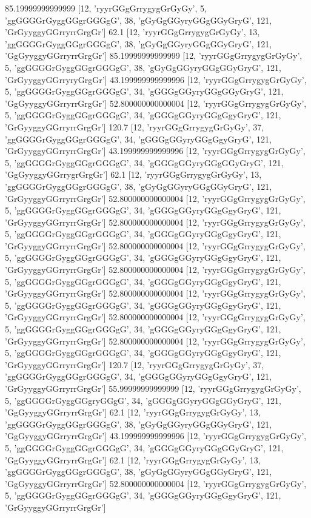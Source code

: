 85.19999999999999 [12, 'ryyrGGgGrrygygGrGyGy', 5, 'ggGGGGrGyggGGgrGGGgG', 38, 'gGyGgGGyryGGgGGyGryG', 121, 'GrGyyggyGGrryrrGrgGr']
62.1 [12, 'ryyrGGgGrrygygGrGyGy', 13, 'ggGGGGrGyggGGgrGGGgG', 38, 'gGyGgGGyryGGgGGyGryG', 121, 'GgGyyggyGGrryrrGrgGr']
85.19999999999999 [12, 'ryyrGGgGrrygygGrGyGy', 5, 'ggGGGGrGyggGGgrGGGgG', 38, 'gGyGgGGyryGGgGGyGryG', 121, 'GrGyyggyGGrryryGrgGr']
43.199999999999996 [12, 'ryyrGGgGrrygygGrGyGy', 5, 'ggGGGGrGyggGGgrGGGgG', 34, 'gGGGgGGyryGGgGGyGryG', 121, 'GgGyyggyGGrryrrGrgGr']
52.800000000000004 [12, 'ryyrGGgGrrygygGrGyGy', 5, 'ggGGGGrGyggGGgrGGGgG', 34, 'gGGGgGGyryGGgGgyGryG', 121, 'GrGyyggyGGrryrrGrgGr']
120.7 [12, 'ryyrGGgGrrygygGrGyGy', 37, 'ggGGGGrGyggGGgrGGGgG', 34, 'gGGGgGGyryGGgGgyGryG', 121, 'GrGyyggyGGrryrrGrgGr']
43.199999999999996 [12, 'ryyrGGgGrrygygGrGyGy', 5, 'ggGGGGrGyggGGgrGGGgG', 34, 'gGGGgGGyryGGgGGyGryG', 121, 'GgGyyggyGGrrygrGrgGr']
62.1 [12, 'ryyrGGgGrrygygGrGyGy', 13, 'ggGGGGrGyggGGgrGGGgG', 38, 'gGyGgGGyryGGgGGyGryG', 121, 'GrGyyggyGGrryrrGrgGr']
52.800000000000004 [12, 'ryyrGGgGrrygygGrGyGy', 5, 'ggGGGGrGyggGGgrGGGgG', 34, 'gGGGgGGyryGGgGgyGryG', 121, 'GrGyyggyGGrryrrGrgGr']
52.800000000000004 [12, 'ryyrGGgGrrygygGrGyGy', 5, 'ggGGGGrGyggGGgrGGGgG', 34, 'gGGGgGGyryGGgGgyGryG', 121, 'GrGyyggyGGrryrrGrgGr']
52.800000000000004 [12, 'ryyrGGgGrrygygGrGyGy', 5, 'ggGGGGrGyggGGgrGGGgG', 34, 'gGGGgGGyryGGgGgyGryG', 121, 'GrGyyggyGGrryrrGrgGr']
52.800000000000004 [12, 'ryyrGGgGrrygygGrGyGy', 5, 'ggGGGGrGyggGGgrGGGgG', 34, 'gGGGgGGyryGGgGgyGryG', 121, 'GrGyyggyGGrryrrGrgGr']
52.800000000000004 [12, 'ryyrGGgGrrygygGrGyGy', 5, 'ggGGGGrGyggGGgrGGGgG', 34, 'gGGGgGGyryGGgGgyGryG', 121, 'GrGyyggyGGrryrrGrgGr']
52.800000000000004 [12, 'ryyrGGgGrrygygGrGyGy', 5, 'ggGGGGrGyggGGgrGGGgG', 34, 'gGGGgGGyryGGgGgyGryG', 121, 'GrGyyggyGGrryrrGrgGr']
52.800000000000004 [12, 'ryyrGGgGrrygygGrGyGy', 5, 'ggGGGGrGyggGGgrGGGgG', 34, 'gGGGgGGyryGGgGgyGryG', 121, 'GrGyyggyGGrryrrGrgGr']
120.7 [12, 'ryyrGGgGrrygygGrGyGy', 37, 'ggGGGGrGyggGGgrGGGgG', 34, 'gGGGgGGyryGGgGgyGryG', 121, 'GrGyyggyGGrryrrGrgGr']
55.99999999999999 [12, 'ryyrGGgGrrygygGrGyGy', 5, 'ggGGGGrGyggGGgryGGgG', 34, 'gGGGgGGyryGGgGGyGryG', 121, 'GgGyyggyGGrryrrGrgGr']
62.1 [12, 'ryyrGGgGrrygygGrGyGy', 13, 'ggGGGGrGyggGGgrGGGgG', 38, 'gGyGgGGyryGGgGGyGryG', 121, 'GgGyyggyGGrryrrGrgGr']
43.199999999999996 [12, 'ryyrGGgGrrygygGrGyGy', 5, 'ggGGGGrGyggGGgrGGGgG', 34, 'gGGGgGGyryGGgGGyGryG', 121, 'GgGyyggyGGrryrrGrgGr']
62.1 [12, 'ryyrGGgGrrygygGrGyGy', 13, 'ggGGGGrGyggGGgrGGGgG', 38, 'gGyGgGGyryGGgGGyGryG', 121, 'GgGyyggyGGrryrrGrgGr']
52.800000000000004 [12, 'ryyrGGgGrrygygGrGyGy', 5, 'ggGGGGrGyggGGgrGGGgG', 34, 'gGGGgGGyryGGgGgyGryG', 121, 'GrGyyggyGGrryrrGrgGr']
